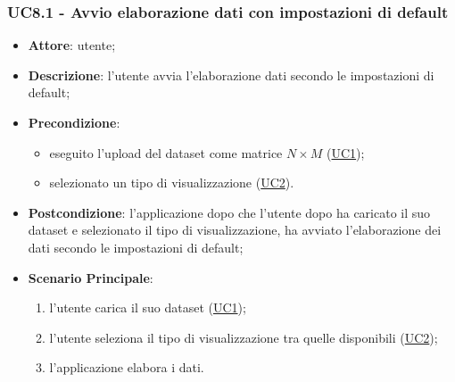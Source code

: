     \subsubsection{UC8.1 - Avvio elaborazione dati con impostazioni di default}
    \label{uc8.1}
    \begin{itemize}
    \item \textbf{Attore}: utente;
    \item \textbf{Descrizione}: l'utente avvia l'elaborazione dati secondo le impostazioni di default;
    \item \textbf{Precondizione}: 
    \begin{itemize}
        \item eseguito l'upload del dataset come matrice $N\times M$ (\hyperref[uc1]{UC1});
        \item selezionato un tipo di visualizzazione (\hyperref[uc2]{UC2}).
    \end{itemize}  
    \item \textbf{Postcondizione}: l'applicazione dopo che l'utente dopo ha caricato il suo dataset e selezionato il tipo di visualizzazione, ha avviato l'elaborazione dei dati secondo le impostazioni di default;
    \item \textbf{Scenario Principale}: 
    \begin{enumerate}
        \item l'utente carica il suo dataset (\hyperref[uc1]{UC1});
        \item l'utente seleziona il tipo di visualizzazione tra quelle disponibili (\hyperref[uc2]{UC2});
        \item l'applicazione elabora i dati.
    \end{enumerate}
    \end{itemize}
    
